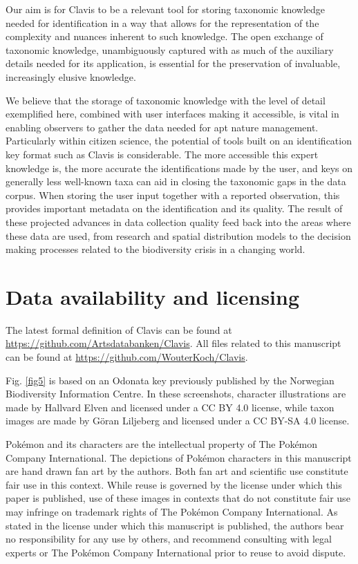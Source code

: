 \documentclass[10pt,letterpaper]{article}
\begin{document}
Our aim is for Clavis to be a relevant tool for storing taxonomic knowledge needed for identification in a way that allows for the representation of the complexity and nuances inherent to such knowledge. The open exchange of taxonomic knowledge, unambiguously captured with as much of the auxiliary details needed for its application, is essential for the preservation of invaluable, increasingly elusive knowledge.

We believe that the storage of taxonomic knowledge with the level of detail exemplified here, combined with user interfaces making it accessible, is vital in enabling observers to gather the data needed for apt nature management. Particularly within citizen science, the potential of tools built on an identification key format such as Clavis is considerable. The more accessible this expert knowledge is, the more accurate the identifications made by the user, and keys on generally less well-known taxa can aid in closing the taxonomic gaps in the data corpus. When storing the user input together with a reported observation, this provides important metadata on the identification and its quality. The result of these projected advances in data collection quality feed back into the areas where these data are used, from research and spatial distribution models to the decision making processes related to the biodiversity crisis in a changing world.

\section*{
Data availability and licensing
}
The latest formal definition of Clavis can be found at \url{https://github.com/Artsdatabanken/Clavis}. All files related to this manuscript can be found at \url{https://github.com/WouterKoch/Clavis}.

Fig. \ref{fig5} is based on an Odonata key previously published by the Norwegian Biodiversity Information Centre. In these screenshots, character illustrations are made by Hallvard Elven and licensed under a CC BY 4.0 license, while taxon images are made by Göran Liljeberg and licensed under a CC BY-SA 4.0 license.

Pokémon and its characters are the intellectual property of The Pokémon Company International. The depictions of Pokémon characters in this manuscript are hand drawn fan art by the authors. Both fan art and scientific use constitute fair use in this context. While reuse is governed by the license under which this paper is published, use of these images in contexts that do not constitute fair use may infringe on trademark rights of The Pokémon Company International. As stated in the license under which this manuscript is published, the authors bear no responsibility for any use by others, and recommend consulting with legal experts or The Pokémon Company International prior to reuse to avoid dispute.
\end{document}
